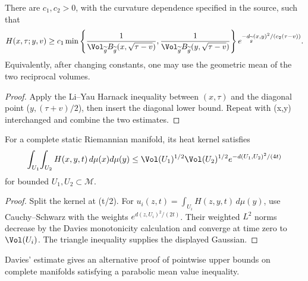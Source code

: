 \begin{theorem}
\label{thm:chow-iii-evolving-heat-kernel-gaussian-lower-bound}
There are \(c_1,c_2>0\), with the curvature dependence specified in the
source, such that
\[
 H(x,\tau;y,v)\ge c_1
 \min\left\{
 \frac1{\Vol_{\widetilde g}B_{\widetilde g}(x,\sqrt{\tau-v})},
 \frac1{\Vol_{\widetilde g}B_{\widetilde g}(y,\sqrt{\tau-v})}
 \right\}
 e^{-d_{\widetilde g}(x,y)^2/(c_2(\tau-v))}.
\]
Equivalently, after changing constants, one may use the geometric mean of
the two reciprocal volumes.
\end{theorem}
\begin{proof}
\sketch Apply the Li--Yau Harnack inequality between \((x,\tau)\) and the diagonal
point (\(y,(\tau+v)/2\)), then insert the diagonal lower bound.  Repeat with
(x,y) interchanged and combine the two estimates.
\end{proof}

\begin{theorem}
\label{thm:chow-iii-davies-double-integral-upper-bound}
For a complete static Riemannian manifold, its heat kernel satisfies
\[
 \int_{U_1}\!\int_{U_2}H(x,y,t)\,d\mu(x)d\mu(y)
 \le \Vol(U_1)^{1/2}\Vol(U_2)^{1/2}
 e^{-d(U_1,U_2)^2/(4t)}
\]
for bounded \(U_1,U_2\subset\mathcal M\).
\end{theorem}
\begin{proof}
\sketch Split the kernel at (t/2).  For
\(u_i(z,t)=\int_{U_i}H(z,y,t)\,d\mu(y)\), use Cauchy--Schwarz with the
weights \(e^{d(z,U_i)^2/(2t)}\).  Their weighted \(L^2\) norms decrease by
the Davies monotonicity calculation and converge at time zero to
\(\Vol(U_i)\).  The triangle inequality supplies the displayed Gaussian.
\end{proof}

\begin{remark}
\label{rem:chow-iii-davies-estimate-pointwise-use}
Davies' estimate gives an alternative proof of pointwise upper bounds on
complete manifolds satisfying a parabolic mean value inequality.
\end{remark}

